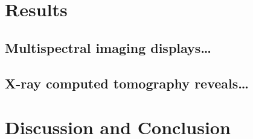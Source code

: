 \newpage
\section{Results }
\subsection{Multispectral imaging displays…}
\subsection{X-ray computed tomography reveals…}

\newpage
\section{Discussion and Conclusion}

